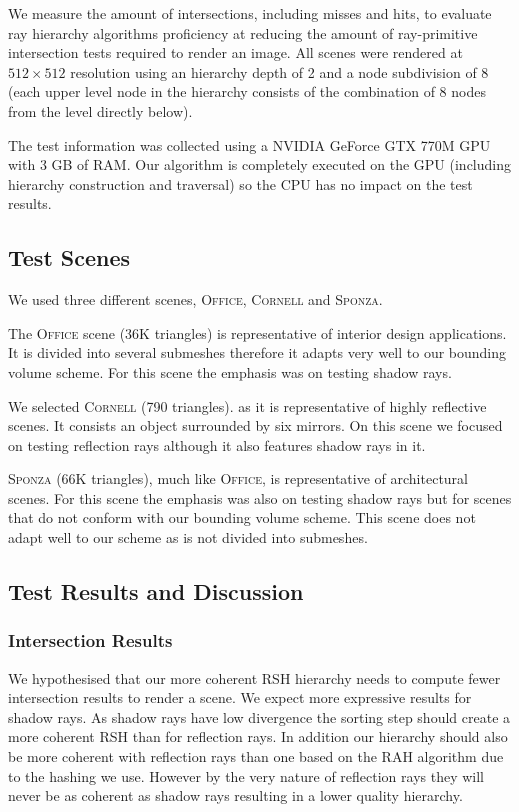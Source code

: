 \documentclass{egpubl}
\begin{document}
We measure the amount of intersections, including misses and hits, to evaluate ray hierarchy algorithms proficiency at reducing the amount of ray-primitive intersection tests required to render an image. All scenes were rendered at $512\times512$ resolution using an hierarchy depth of 2 and a node subdivision of 8 (each upper level node in the hierarchy consists of the combination of 8 nodes from the level directly below).

The test information was collected using a NVIDIA GeForce GTX 770M GPU with 3 GB of RAM. Our algorithm is completely executed on the GPU (including hierarchy construction and traversal) so the CPU has no impact on the test results.

\subsection{Test Scenes}

We used three different scenes, \textsc{Office}, \textsc{Cornell} and \textsc{Sponza}.

The \textsc{Office} scene (36K triangles) is representative of interior design applications. It is divided into several submeshes therefore it adapts very well to our bounding volume scheme. For this scene the emphasis was on testing shadow rays. 

We selected \textsc{Cornell} (790 triangles). as it is representative of highly reflective scenes. It consists an object surrounded by six mirrors. On this scene we focused on testing reflection rays although it also features shadow rays in it.

\textsc{Sponza} (66K triangles), much like \textsc{Office}, is representative of architectural scenes. For this scene the emphasis was also on testing shadow rays but for scenes that do not conform with our bounding volume scheme. This scene does not adapt well to our scheme as is not divided into submeshes. 

\subsection{Test Results and Discussion}

\subsubsection{Intersection Results}

We hypothesised that our more coherent RSH hierarchy needs to compute fewer intersection results to render a scene. We expect more expressive results for shadow rays. As shadow rays have low divergence the sorting step should create a more coherent RSH than for reflection rays. In addition our hierarchy should also be more coherent with reflection rays than one based on the RAH algorithm due to the hashing we use. However by the very nature of reflection rays they will never be as coherent as shadow rays resulting in a lower quality hierarchy.
\end{document}
